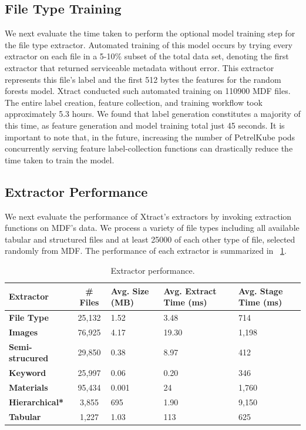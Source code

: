 \documentclass[sigconf]{acmart}
\newcommand{\name}{Xtract}
\begin{document}
\subsection{File Type Training}
We next evaluate the time taken to perform the optional model training step for the file type extractor. 
Automated training of this model occurs by trying every extractor on each file 
in a 5-10\% subset of the total data set, denoting the first extractor that returned serviceable metadata without error. 
This extractor represents this file's label and the first 512 bytes the features for the random forests model. 
\name{} conducted such automated training on \num{110900} MDF files.
The entire label creation, feature collection, and training workflow took
approximately \num{5.3} hours.
We found that label generation constitutes a majority of this time, as
feature generation and model training total just 45 seconds. It is important to note that, in the future, increasing the 
number of PetrelKube pods concurrently serving feature label-collection functions can drastically
reduce the time taken to train the model.


\subsection{Extractor Performance}
We next evaluate the performance of \name{}'s extractors by invoking extraction functions on MDF's data.
We process a variety of file types including all available tabular and structured files and 
at least \num{25000} of each other type of file, selected randomly from MDF.
The performance of each extractor is summarized in \tablename{~\ref{tab:extractors}}.

\begin{table}[h]
	\caption{Extractor performance.} \label{tab:extractors}
\begin{center}
	\small
	\begin{tabular}{l c p{1.3cm} p{1.6cm} p{1.4cm}} 
 \hline
		\textbf{Extractor} & \# \textbf{Files} & \textbf{Avg. Size (MB)} & \textbf{Avg. Extract Time (ms)} & \textbf{Avg. Stage Time (ms)}\\ [0.5ex] 
 \hline
		\textbf{File Type} & 25,132         & 1.52 & 3.48 & 714 \\ 
 \hline
		\textbf{Images} & 76,925            & 4.17 & 19.30 & 1,198\\
 \hline
		 \textbf{Semi-strucured} & 29,850   & 0.38 & 8.97 & 412\\
 \hline
		\textbf{Keyword} & 25,997           & 0.06 & 0.20  & 346\\
 \hline
		\textbf{Materials} & 95,434         & 0.001 & 24 & 1,760\\
 \hline
		\textbf{Hierarchical*} & 3,855      & 695 & 1.90 & 9,150\\
 \hline
		\textbf{Tabular} & 1,227            & 1.03 & 113 & 625\\
 \hline
 
\end{tabular}
\end{center}
\end{table}
\end{document}
